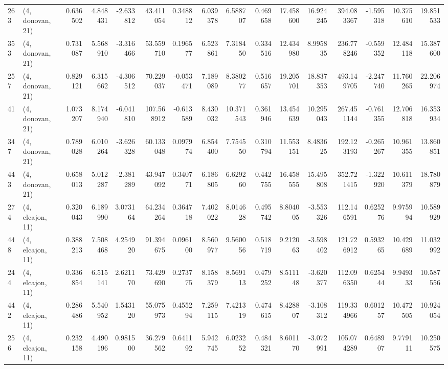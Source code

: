 \begin{tabular}{llrrrrrrrrrrrrrr}
263 &  (4, donovan, 21) &   0.636502 &   4.848431 &  -2.633812 &    43.411054 &   0.348812 &   6.039378 &   6.588707 &  0.469658 &  17.458600 &  16.924245 &   394.083367 & -1.595318 &  10.375610 &  19.851533 \\
353 &  (4, donovan, 21) &   0.731087 &   5.568910 &  -3.316466 &    53.559710 &   0.196577 &   6.523861 &   7.318450 &  0.334516 &  12.434980 &   8.995835 &   236.778246 & -0.559352 &  12.484118 &  15.387600 \\
257 &  (4, donovan, 21) &   0.829121 &   6.315662 &  -4.306512 &    70.229037 &  -0.053471 &   7.189089 &   8.380277 &  0.516657 &  19.205701 &  18.837353 &   493.149705 & -2.247740 &  11.760265 &  22.206974 \\
41  &  (4, donovan, 21) &   1.073207 &   8.174940 &  -6.041810 &   107.568912 &  -0.613589 &   8.430032 &  10.371543 &  0.361946 &  13.454639 &  10.295043 &   267.451144 & -0.761355 &  12.706818 &  16.353934 \\
347 &  (4, donovan, 21) &   0.789028 &   6.010264 &  -3.626328 &    60.133048 &   0.097974 &   6.854400 &   7.754550 &  0.310794 &  11.553151 &   8.483625 &   192.123193 & -0.265267 &  10.961355 &  13.860851 \\
443 &  (4, donovan, 21) &   0.658013 &   5.012287 &  -2.381289 &    43.947092 &   0.340771 &   6.186805 &   6.629260 &  0.442755 &  16.458555 &  15.495808 &   352.721415 & -1.322920 &  10.611379 &  18.780879 \\
274 &  (4, elcajon, 11) &   0.320043 &   6.189990 &   3.073164 &    64.234264 &   0.364718 &   7.402022 &   8.014628 &  0.495742 &   8.804005 &  -3.553326 &   112.146591 &  0.625276 &   9.975994 &  10.589929 \\
448 &  (4, elcajon, 11) &   0.388213 &   7.508468 &   4.254920 &    91.394675 &   0.096100 &   8.560977 &   9.560056 &  0.518719 &   9.212063 &  -3.598402 &   121.726912 &  0.593265 &  10.429689 &  11.032992 \\
244 &  (4, elcajon, 11) &   0.336854 &   6.515141 &   2.621170 &    73.429690 &   0.273775 &   8.158379 &   8.569113 &  0.479252 &   8.511148 &  -3.620377 &   112.096350 &  0.625444 &   9.949333 &  10.587556 \\
442 &  (4, elcajon, 11) &   0.286486 &   5.540952 &   1.543120 &    55.075973 &   0.455294 &   7.259115 &   7.421319 &  0.474615 &   8.428807 &  -3.108312 &   119.334966 &  0.601257 &  10.472505 &  10.924054 \\
256 &  (4, elcajon, 11) &   0.232158 &   4.490196 &   0.981500 &    36.279562 &   0.641192 &   5.942745 &   6.023252 &  0.484321 &   8.601170 &  -3.072991 &   105.074289 &  0.648907 &   9.779111 &  10.250575 \\

\end{tabular}

